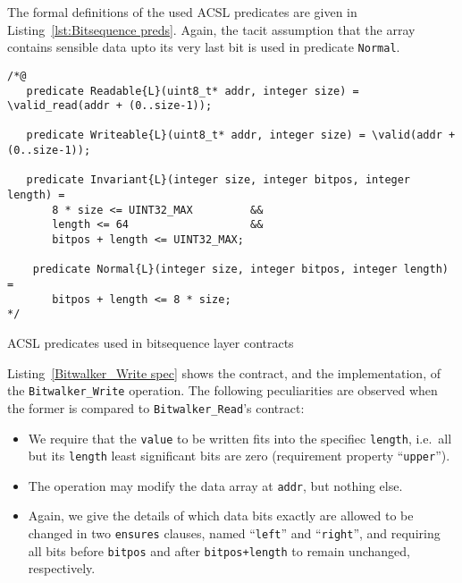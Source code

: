 The formal definitions of the used ACSL predicates are given in
Listing~\ref{lst:Bitsequence preds}.
%
Again, the tacit assumption that the array contains sensible data
upto its very last bit is used in predicate \lstinline{Normal}.









\begin{listing}[hbt]
\begin{minipage}{0.99\textwidth}
\begin{lstlisting}[style=acsl-block]
/*@
   predicate Readable{L}(uint8_t* addr, integer size) = \valid_read(addr + (0..size-1));

   predicate Writeable{L}(uint8_t* addr, integer size) = \valid(addr + (0..size-1));

   predicate Invariant{L}(integer size, integer bitpos, integer length) =
       8 * size <= UINT32_MAX         &&
       length <= 64                   &&
       bitpos + length <= UINT32_MAX;

    predicate Normal{L}(integer size, integer bitpos, integer length) =
       bitpos + length <= 8 * size;
*/
\end{lstlisting}
\end{minipage}
\caption{\label{lst:Bitsequence preds} ACSL predicates used in bitsequence layer contracts}
\end{listing}





Listing~\ref{Bitwalker_Write spec} shows the contract, and the
implementation, of the
\lstinline{Bitwalker_Write} operation.
%
The following peculiarities are observed when the former is
compared to \lstinline{Bitwalker_Read}'s contract:
%
\begin{itemize}
\item We require that the \lstinline{value} to be written fits into
the specifiec
	\lstinline{length}, i.e.\ all but its \lstinline{length}
	least significant bits are
	zero (requirement property ``\lstinline{upper}'').
\item The operation may modify the data array at \lstinline{addr},
but nothing else.
\item Again, we give the details of which data bits exactly
	are allowed to be changed in two
	\lstinline{ensures} clauses, named ``\lstinline{left}'' and
	``\lstinline{right}'', and requiring all bits before
	\lstinline{bitpos} and after
	\lstinline{bitpos+length} to remain unchanged, respectively.
\end{itemize}

